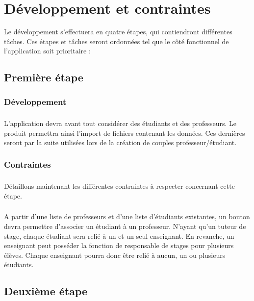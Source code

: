 \documentclass[a4paper,10pt]{report}
\begin{document}
  \chapter{Développement et contraintes}

    Le développement s'effectuera en quatre étapes, qui contiendront différentes tâches. Ces étapes et tâches seront ordonnées tel que le côté fonctionnel de l'application soit prioritaire :

    \section{Première étape}

      \subsection{Développement}
	\paragraph{}
	L'application devra avant tout considérer des étudiants et des professeurs.
	\newline
	Le produit permettra ainsi l'import de fichiers contenant les données. 
	Ces dernières seront par la suite utilisées lors de la création de couples professeur/étudiant. 
  
      \subsection{Contraintes}
	\paragraph{}
	Détaillons maintenant les différentes contraintes à respecter concernant cette étape. 
	\paragraph{}
	A partir d'une liste de professeurs et d'une liste d'étudiants existantes, un bouton devra permettre d'associer un étudiant à un professeur.
	N'ayant qu'un tuteur de stage, chaque étudiant sera relié à un et un seul enseignant.
	En revanche, un enseignant peut posséder la fonction de responsable de stages pour plusieurs élèves. 
	Chaque enseignant pourra donc être relié à aucun, un ou plusieurs étudiants.	
	
      
	
    \section{Deuxième étape}
\end{document}
